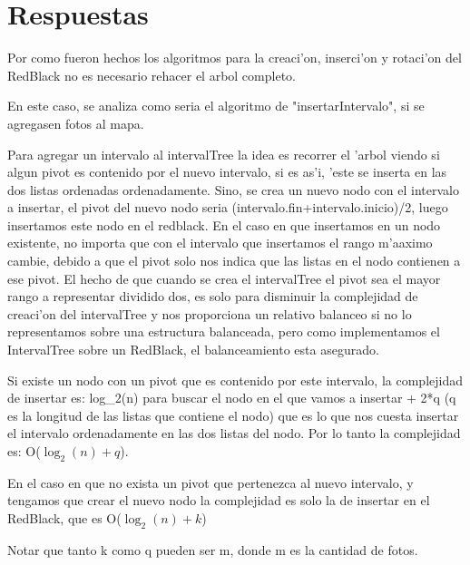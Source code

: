
\section{Respuestas}

Por como fueron hechos los algoritmos para la creaci'on, inserci'on y rotaci'on del RedBlack no es necesario rehacer el arbol completo. 

En este caso, se analiza como seria el algoritmo de "insertarIntervalo", si se agregasen fotos al mapa.

Para agregar un intervalo al intervalTree la idea es recorrer el 'arbol viendo si algun pivot es contenido por el nuevo intervalo, si es as'i, 'este se inserta en las dos listas ordenadas ordenadamente. Sino, se crea un nuevo nodo con el intervalo a insertar, el pivot del nuevo nodo seria (intervalo.fin+intervalo.inicio)/2, luego insertamos este nodo en el redblack.
En el caso en que insertamos en un nodo existente, no importa que con el intervalo que insertamos el rango m'aaximo cambie, debido a que el pivot solo nos indica que las listas en el nodo contienen a ese pivot. El hecho de que cuando se crea el intervalTree el pivot sea el mayor rango a representar dividido dos, es solo para disminuir la complejidad de creaci'on del intervalTree y nos proporciona un relativo balanceo si no lo representamos sobre una estructura balanceada, pero como implementamos el IntervalTree sobre un RedBlack, el balanceamiento esta asegurado.

Si existe un nodo con un pivot que es contenido por este intervalo, la complejidad de insertar es:
log_2(n) para buscar el nodo en el que vamos a insertar + 2*q (q es la longitud de las listas que contiene el nodo) que es lo que nos cuesta insertar el intervalo ordenadamente en las dos listas del nodo.
Por lo tanto la complejidad es: O($\log_2(n) + q$).

En el caso en que no exista un pivot que pertenezca al nuevo intervalo, y tengamos que crear el nuevo nodo la complejidad es solo la de insertar en el RedBlack, que es O($\log_2(n)+k$)

Notar que tanto k como q pueden ser m, donde m es la cantidad de fotos.
